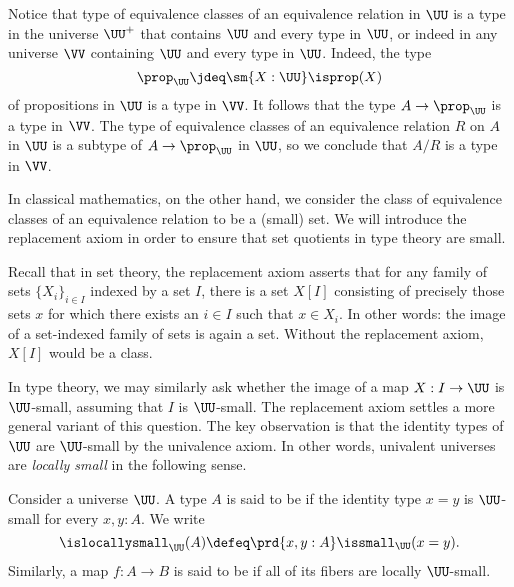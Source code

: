 \begin{rmk}
  Notice that type of equivalence classes of an equivalence relation in $\UU$ is a type in the universe $\UU^+$ that contains $\UU$ and every type in $\UU$, or indeed in any universe $\VV$ containing $\UU$ and every type in $\UU$. Indeed, the type
  \begin{equation*}
    \prop_\UU\jdeq\sm{X:\UU}\isprop(X)
  \end{equation*}
  of propositions in $\UU$ is a type in $\VV$. It follows that the type $A\to\prop_\UU$ is a type in $\VV$. The type of equivalence classes of an equivalence relation $R$ on $A$ in $\UU$ is a subtype of $A\to\prop_\UU$ in $\UU$, so we conclude that $A/R$ is a type in $\VV$.
\end{rmk}

In classical mathematics, on the other hand, we consider the class of equivalence classes of an equivalence relation to be a (small) set. We will introduce the replacement axiom in order to ensure that set quotients in type theory are small.

Recall that in set theory, the replacement axiom asserts that for any family of sets $\{X_i\}_{i\in I}$ indexed by a set $I$, there is a set $X[I]$ consisting of precisely those sets $x$ for which there exists an $i\in I$ such that $x\in X_i$. In other words: the image of a set-indexed family of sets is again a set. Without the replacement axiom, $X[I]$ would be a class.

In type theory, we may similarly ask whether the image of a map $X:I\to\UU$ is $\UU$-small, assuming that $I$ is $\UU$-small. The replacement axiom settles a more general variant of this question. The key observation is that the identity types of $\UU$ are $\UU$-small by the univalence axiom. In other words, univalent universes are \emph{locally small} in the following sense.

\begin{defn}\label{defn:locally-small-type}
  Consider a universe $\UU$. A type $A$ is said to be  if the identity type $x=y$ is $\UU$-small for every $x,y:A$.
    We write
    \begin{equation*}
      \islocallysmall_\UU(A)\defeq \prd{x,y:A}\issmall_\UU(x=y).
    \end{equation*}
    Similarly, a map $f:A\to B$ is said to be  if all of its fibers are locally $\UU$-small.
\end{defn}

